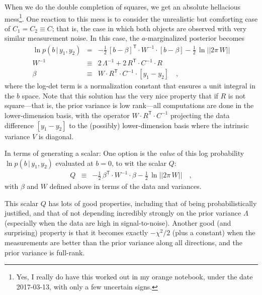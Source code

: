 \documentclass[12pt,letterpaper]{article}
\newcommand{\transpose}[1]{{#1}^{\mathsf{T}}}
\newcommand{\inverse}[1]{{#1}^{-1}}
\renewcommand{\det}[1]{||{#1}||}
\newcommand{\given}{\,|\,}
\begin{document}
When we do the double completion of squares, we get an absolute
hellacious mess\footnote{Yes, I really do have this worked out in my
  orange notebook, under the date 2017-03-13, with only a few
  uncertain signs.}.
One reaction to this mess is to consider the
unrealistic but comforting case of $C_1=C_2\equiv C$; that is, the case in
which both objects are observed with very similar measurement noise.
In this case, the $a$-marginalized posterior becomes
\begin{eqnarray}
\ln p(b\given y_1,y_2) &=&
  -\frac{1}{2}\,\transpose{[b-\beta]}\cdot\inverse{W}\cdot [b-\beta]
  -\frac{1}{2}\,\ln\det{2\pi\,W} \\
\inverse{W} &\equiv&
  2\,\inverse{\Lambda} + 2\,\transpose{R}\cdot\inverse{C}\cdot R \\
\beta &\equiv&
  W\cdot\transpose{R}\cdot\inverse{C}\cdot [y_1 - y_2]
\quad ,
\end{eqnarray}
where the log-det term is a normalization constant that ensures a unit
integral in the $b$ space. Note that this solution has the very nice
property that if $R$ is not square---that is, the prior variance is
low rank---all computations are done in the lower-dimension basis,
with the operator $W\cdot\transpose{R}\cdot\inverse{C}$ projecting the
data difference $[y_1-y_2]$ to the (possibly) lower-dimension basis
where the intrinsic variance $V$ is diagonal.

In terms of generating a scalar: One option is the \emph{value} of
this log probability $\ln p(b\given y_1,y_2)$ evaluated at $b=0$, to
wit the scalar $Q$:
\begin{eqnarray}
Q &\equiv&
  -\frac{1}{2}\,\transpose{\beta}\cdot\inverse{W}\cdot\beta
  -\frac{1}{2}\,\ln\det{2\pi\,W} \quad ,
\end{eqnarray}
with $\beta$ and $W$ defined above in terms of the data and variances.

This scalar $Q$ has lots of good properties, including that of being
probabilistically justified, and that of not depending incredibly
strongly on the prior variance $\Lambda$ (especially when the data are
high in signal-to-noise). Another good (and surprising) property is
that it becomes exactly $-\chi^2/2$ (plus a constant) when the
measurements are better than the prior variance along all directions,
and the prior variance is full-rank.
\end{document}
